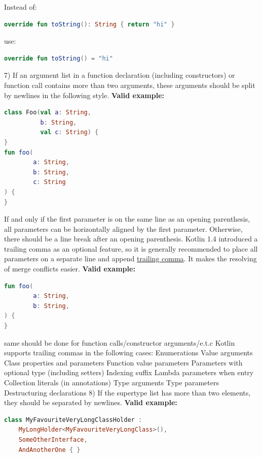 Instead of:
\begin{lstlisting}[language=Kotlin]
override fun toString(): String { return "hi" }
\end{lstlisting}
use:
\begin{lstlisting}[language=Kotlin]
override fun toString() = "hi"
\end{lstlisting}
7)  If an argument list in a function declaration (including constructors) or function call contains more than two arguments, these arguments should be split by newlines in the following style.
\textbf{Valid example:}
\begin{lstlisting}[language=Kotlin]
class Foo(val a: String,
          b: String,
          val c: String) {
}
fun foo(
        a: String,
        b: String,
        c: String
) {
}
\end{lstlisting}
If and only if the first parameter is on the same line as an opening parenthesis, all parameters can be horizontally aligned by the first parameter.
Otherwise, there should be a line break after an opening parenthesis.
Kotlin 1.4 introduced a trailing comma as an optional feature, so it is generally recommended to place all parameters on a separate line
and append \href{https://kotlinlang.org/docs/reference/whatsnew14.html#trailing-comma}{trailing comma}.
It makes the resolving of merge conflicts easier.
\textbf{Valid example:}
\begin{lstlisting}[language=Kotlin]
fun foo(
        a: String,
        b: String,
) {
}
\end{lstlisting}
same should be done for function calls/constructor arguments/e.t.c
Kotlin supports trailing commas in the following cases:
Enumerations
Value arguments
Class properties and parameters
Function value parameters
Parameters with optional type (including setters)
Indexing suffix
Lambda parameters
when entry
Collection literals (in annotations)
Type arguments
Type parameters
Destructuring declarations
8) If the supertype list has more than two elements, they should be separated by newlines.
\textbf{Valid example:}
\begin{lstlisting}[language=Kotlin]
class MyFavouriteVeryLongClassHolder :
    MyLongHolder<MyFavouriteVeryLongClass>(),
    SomeOtherInterface,
    AndAnotherOne { }
\end{lstlisting}
